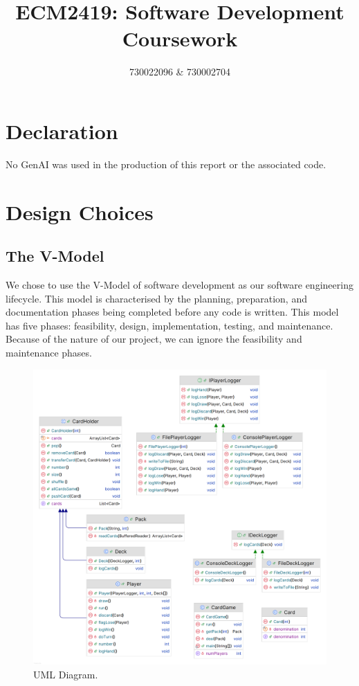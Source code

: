 \documentclass{article}
\title{ECM2419: Software Development Coursework}
\author{730022096 \& 730002704}
\date{}
\begin{document}
\maketitle
\tableofcontents
\section*{Declaration}
No GenAI was used in the production of this report or the associated code.

\clearpage

\section{Design Choices} %
\subsection{The V-Model}
We chose to use the V-Model of software development as our software engineering lifecycle. This model is characterised by the planning, preparation, and documentation phases being completed before any code is written. This model has five phases: feasibility, design, implementation, testing, and maintenance. Because of the nature of our project, we can ignore the feasibility and maintenance phases.

\begin{figure}
    \centering
    \includegraphics[width=.52\textwidth]{uml}
    \caption{UML Diagram.}
    \label{fig:uml}
\end{figure}
\end{document}
